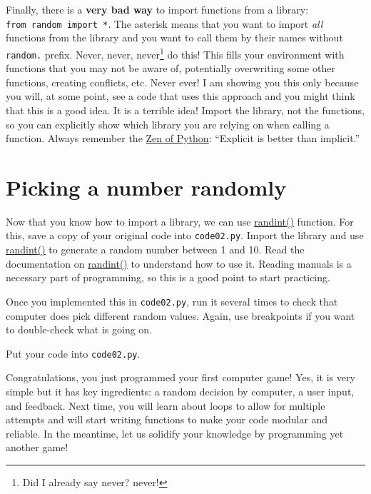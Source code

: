 \documentclass[
]{book}
\begin{document}
Finally, there is a \textbf{very bad way} to import functions from a library: \texttt{from\ random\ import\ *}. The asterisk means that you want to import \emph{all} functions from the library and you want to call them by their names without \texttt{random.} prefix. Never, never, never\footnote{Did I already say never? never!} do this! This fills your environment with functions that you may not be aware of, potentially overwriting some other functions, creating conflicts, etc. Never ever! I am showing you this only because you will, at some point, see a code that uses this approach and you might think that this is a good idea. It is a terrible idea! Import the library, not the functions, so you can explicitly show which library you are relying on when calling a function. Always remember the \href{https://www.python.org/dev/peps/pep-0020/}{Zen of Python}: ``Explicit is better than implicit.''

\hypertarget{picking-a-number-randomly}{%
\section{Picking a number randomly}\label{picking-a-number-randomly}}

Now that you know how to import a library, we can use \href{https://docs.python.org/3/library/random.html\#random.randint}{randint()} function. For this, save a copy of your original code into \texttt{code02.py}. Import the library and use \href{https://docs.python.org/3/library/random.html\#random.randint}{randint()} to generate a random number between 1 and 10. Read the documentation on \href{https://docs.python.org/3/library/random.html\#random.randint}{randint()} to understand how to use it. Reading manuals is a necessary part of programming, so this is a good point to start practicing.

Once you implemented this in \texttt{code02.py}, run it several times to check that computer does pick different random values. Again, use breakpoints if you want to double-check what is going on.

Put your code into \texttt{code02.py}.

Congratulations, you just programmed your first computer game! Yes, it is very simple but it has key ingredients: a random decision by computer, a user input, and feedback. Next time, you will learn about loops to allow for multiple attempts and will start writing functions to make your code modular and reliable. In the meantime, let us solidify your knowledge by programming yet another game!
\end{document}
